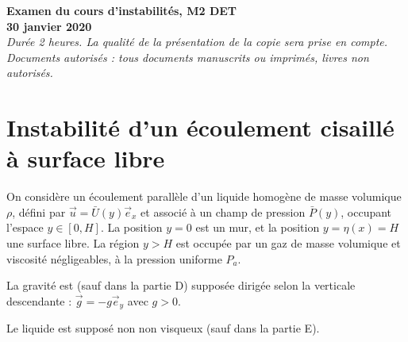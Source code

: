 \documentclass[a4paper,11pt]{article}
\begin{document}
{\Large
\noindent

\begin{center}
{\bf Examen du cours d'instabilités, M2 DET \\
 30 janvier 2020} \\
{\it \small Durée 2 heures. La qualité de la présentation de la copie sera prise en compte. 
} \\
{\it \small Documents autorisés : tous documents manuscrits ou imprimés, livres non autorisés.}
\end{center}
}

%


\section{Instabilité d'un écoulement cisaillé à surface libre}

On considère un écoulement parallèle d'un liquide homogène de masse volumique $\rho$, défini par $\vec u = \bar{U}(y) \vec{e}_x
$ et associé à un champ de pression $\bar{P}(y)$, occupant l'espace $y \in [0,H]$. La position $y=0$ est un mur, et la position $y= \eta(x) = H$ une surface libre. La région $y>H$ est occupée par un gaz de masse volumique et viscosité négligeables, à la pression uniforme $P_a$.

La gravité est (sauf dans la partie D) supposée dirigée selon la verticale descendante : $\vec g = - g \vec e_y$ avec $g >0$.

Le liquide est supposé non non visqueux (sauf dans la partie E). 
 
\end{document}
